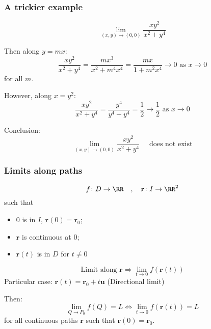 \begin{frame}
  \frametitle{A trickier example}
    $$\lim_{(x,y) \to (0,0)} \frac{xy^2}{x^2+y^4}$$

    Then along $y=mx$:
    $$\frac{xy^2}{x^2+y^4} = \frac{mx^3}{x^2+m^4x^4} =  \frac{mx}{1+m^2x^4} \to  0 \text{ as } x \to 0$$
    for all $m$.

    \pause
    However, along $x=y^2$:
    $$\frac{xy^2}{x^2+y^4} = \frac{y^4}{y^4+y^4} =  \frac{1}{2} \to  \frac{1}{2} \text{ as } x \to 0$$

    \pause
    Conclusion:
    $$\lim_{(x,y) \to (0,0)} \frac{xy^2}{x^2+y^4} \quad \text{ does not exist}$$
\end{frame}

\begin{frame}
  \frametitle{Limits along paths}

  $$f \colon D \to \RR \quad , \quad \textbf{r} \colon I \to \RR^2$$
  such that
  \begin{itemize}
    \item $0$ is in $I$, $\textbf{r}(0) = \textbf{r}_0$;
    \item $\textbf{r}$ is continuous at $0$;
    \item $\textbf{r}(t)$ is in $D$ for $t\neq 0$
  \end{itemize}
  $$\text{Limit along } \textbf{r} \Longrightarrow \lim_{t\to 0} f(\textbf{r}(t))$$
  \pause
  Particular case: $\textbf{r}(t) = \textbf{r}_0+t\textbf{u}$ (Directional limit)

  \pause
  Then:
  $$\lim_{Q \to P_0} f(Q) =L \Longleftrightarrow \lim_{t\to 0} f(\textbf{r}(t))=L$$
  for all continuous paths $\textbf{r}$ such that $\textbf{r}(0)=\textbf{r}_0$.
\end{frame}


